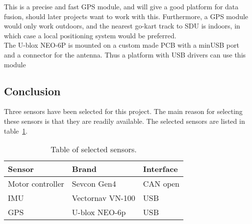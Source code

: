 This is a precise and fast GPS module, and will give a good platform for data fusion, should later projects want to work with this.
Furthermore, a GPS module would only work outdoors, and the nearest go-kart track to SDU is indoors, in which case a local positioning system would be preferred.\\

The U-blox NEO-6P is mounted on a custom made PCB with a minUSB port and a connector for the antenna. 
Thus a platform with USB drivers can use this module

\subsection{Conclusion}
Three sensors have been selected for this project. 
The main reason for selecting these sensors is that they are readily available.
The selected sensors are listed in table~\ref{tab:sensor_conclusion}.

\begin{table}[H]
	\centering
	\caption{Table of selected sensors.}
	\label{tab:sensor_conclusion}
	\begin{tabular}{|l|l|l|}
		\hline
		\textbf{Sensor} & \textbf{Brand} & \textbf{Interface} \\
		\hline
		Motor controller & Sevcon Gen4 & CAN open \\ 
		\hline
		IMU & Vectornav VN-100 & USB\\
		\hline
		GPS & U-blox NEO-6p & USB\\
		\hline
	\end{tabular}
\end{table}

